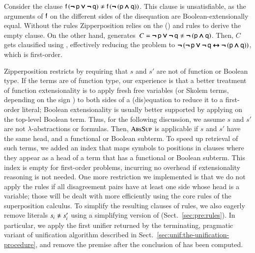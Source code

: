 Consider the clause $\cst{f} \, (\inot\cst{p} \ior \inot\cst{q}) \noteq \cst{f} \,
(\inot (\cst{p} \iand \cst{q}))$. This clause is unsatisfiable, as
the arguments of $\mathsf{f}$ on the different sides of the disequation are Boolean-extensionally
equal. Without the  rules Zipperposition relies on the
() and  rules to derive the empty
clause. On the other hand,  generates~$C = \inot\cst{p} \ior \inot\cst{q} \noteq
\inot (\cst{p} \iand \cst{q})$. Then, $C$ gets clausified using
, effectively reducing the problem to $\pmb{\neg\,} (\pmb{\neg\,}\mathsf{p} \pmb{\lor}
\pmb{\neg\,}\mathsf{q} \pmb{\leftrightarrow} \pmb{\neg\,} (\mathsf{p} \pmb{\land} \mathsf{q}))$, which is first-order.

\begin{sloppypar}
  Zipperposition restricts  by
  requiring that $s$ and $s'$ are not of function or Boolean type. If the terms are of function type, our experience is
  that a better treatment of function extensionality is to apply fresh free
  variables (or Skolem terms, depending on the sign
  \cite{bbtvw-21-sup-lam}) to both sides of a (dis)equation to reduce it to
  a first-order literal; Boolean extensionality is usually better supported by
  applying  on the top-level Boolean term. Thus, for the following
  discussion, we assume $s$ and $s'$ are not $\lambda$-abstractions or formulas. Then, $\textsc{AbsSup}$ is applicable if $s$
  and $s'$ have the same head, and a functional or Boolean subterm. To speed up
  retrieval of such terms, we added an index that maps symbols to positions in
  clauses where they appear as a head of a term that has a functional or Boolean
  subterm. This index is empty for first-order problems, incurring no
  overhead if extensionality reasoning is not needed. One more restriction we implemented is that we do not apply the  rules if all
  disagreement pairs have at least one side whose head is a variable; those will
  be dealt with more efficiently using the core rules of the superposition
  calculus. To simplify the resulting clauses of  rules, we also
  eagerly remove literals $s_i \not\approx s'_i$ using a simplifying version of
   (Sect.~\ref{sec:pre:rules}). In particular, we apply the first
  unifier returned by the terminating, pragmatic variant of unification
  algorithm described in Sect.~\ref{sec:unif:the-unification-procedure}, and
  remove the premise after the conclusion of  has been computed.
\end{sloppypar}

